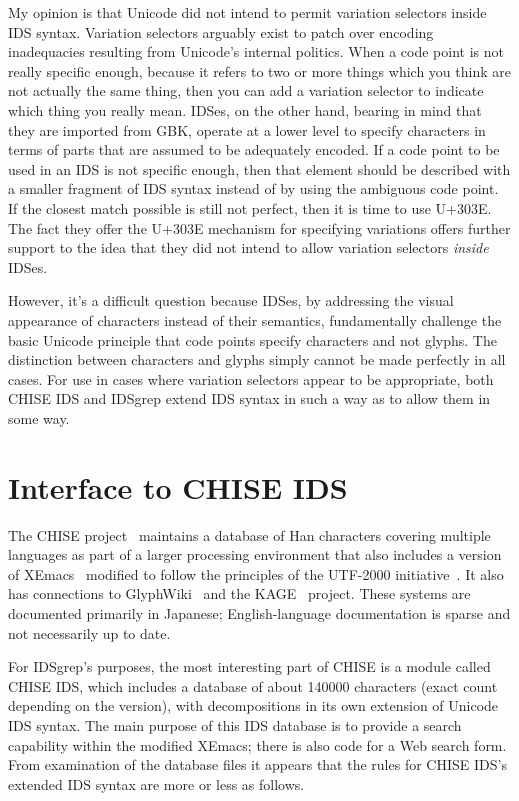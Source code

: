 \documentclass[twocolumn]{report}
\begin{document}
My opinion is that Unicode did not intend to permit variation selectors
inside IDS syntax.  Variation selectors arguably exist to patch over
encoding inadequacies resulting from Unicode's internal politics.  When a
code point is not really specific enough, because it refers to two or more
things which you think are not actually the same thing, then you can add a
variation selector to indicate which thing you really mean.  IDSes, on the
other hand, bearing in mind that they are imported from GBK, operate at a
lower level to specify characters in terms of parts that are assumed to be
adequately encoded.  If a code point to be used in an IDS is not specific
enough, then that element should be described with a smaller fragment of IDS
syntax instead of by using the ambiguous code point.  If the closest match
possible is still not perfect, then it is time to use U+303E.  The fact they
offer the U+303E mechanism for specifying variations offers further support
to the idea that they did not intend to allow variation selectors
\emph{inside} IDSes.

However, it's a difficult question because IDSes, by addressing the visual
appearance of characters instead of their semantics, fundamentally challenge
the basic Unicode principle that code points specify characters and not
glyphs.  The distinction between characters and glyphs simply cannot be made
perfectly in all cases.  For use in cases where variation selectors appear
to be appropriate, both CHISE IDS and IDSgrep extend IDS syntax in
such a way as to allow them in some way.


\section{Interface to CHISE IDS}

The CHISE project~\cite{CHISE} maintains a database of Han characters
covering multiple languages as part of a larger processing environment that
also includes a version of XEmacs~\cite{XEmacs} modified to follow the
principles of the UTF-2000 initiative~\cite{UTF2000}.  It also has
connections to GlyphWiki~\cite{GlyphWiki} and the KAGE~\cite{KAGE} project. 
These systems are documented primarily in Japanese; English-language
documentation is sparse and not necessarily up to date.

For IDSgrep's purposes, the most interesting part of CHISE is a module
called CHISE IDS, which includes a database of about 140000 characters
(exact count depending on the version), with decompositions in its own
extension of Unicode IDS syntax.  The main purpose of this IDS database is
to provide a search capability within the modified XEmacs; there is also
code for a Web search form.  From examination of the database files it
appears that the rules for CHISE IDS's extended IDS syntax are more or less
as follows.
\end{document}

